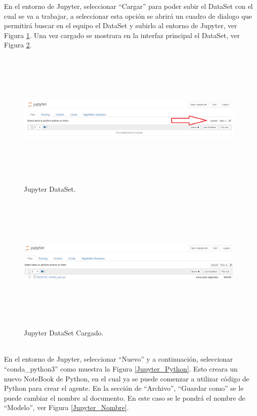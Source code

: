 \documentclass[a4paper,10pt, oneside, titlepage]{article}
\begin{document}
	\indent En el entorno de Jupyter, seleccionar ``Cargar'' para poder subir el DataSet con el cual se va a trabajar, a seleccionar esta opción se abrirá un cuadro de dialogo que permitirá buscar en el equipo el DataSet y subirlo al entorno de Jupyter, ver Figura \ref{Jupyter_DataSet}. Una vez cargado se mostrara en la interfaz principal el DataSet, ver Figura \ref{Jupyter_DataSet_Cargado}.
	\begin{figure}[!h]
		\centering
		\includegraphics[width = 1\linewidth, height = 6.7cm]{Jupyter_DataSet.png}
		\caption{Jupyter DataSet.}
		\label{Jupyter_DataSet}
	\end{figure}
	\begin{figure}[!h]
		\centering
		\includegraphics[width = 1\linewidth, height = 6.7cm]{Jupyter_DataSet_Cargado.png}
		\caption{Jupyter DataSet Cargado.}
		\label{Jupyter_DataSet_Cargado}
	\end{figure} \\
	\indent En el entorno de Jupyter, seleccionar ``Nuevo'' y a continuación, seleccionar ``conda\_python3'' como muestra la Figura \ref{Jupyter_Python}. Esto creara un nuevo NoteBook de Python, en el cual ya se puede comenzar a utilizar código de Python para crear el agente. En la sección de ``Archivo'', ``Guardar como'' se le puede cambiar el nombre al documento. En este caso se le pondrá el nombre de ``Modelo'', ver Figura \ref{Jupyter_Nombre}.
\end{document}
